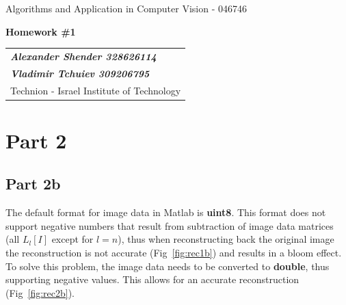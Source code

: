 \documentclass[a4paper]{iacas}
\begin{document}
\begin{center}
 \large Algorithms and Application in Computer Vision - 046746
 \end{center}
\begin{center}
\large\textbf{Homework \#1}
 \end{center}


\begin{tabular}{l}
\\
{\bf\textit{Alexander Shender 328626114}} \\
{\bf\textit{Vladimir Tchuiev 309206795}} \\
Technion - Israel Institute of Technology
\end{tabular}

\vspace{2em}

\section{Part 2}

\subsection{Part 2b}

The default format for image data in Matlab is \textbf{uint8}. This format does not support negative numbers that result from subtraction of image data matrices (all $L_l[I]$ except for $l=n$), thus when reconstructing back the original image the reconstruction is not accurate (Fig~\ref{fig:rec1b}) and results in a bloom effect. To solve this problem, the image data needs to be converted to \textbf{double}, thus supporting negative values. This allows for an accurate reconstruction (Fig~\ref{fig:rec2b}).
\end{document}
